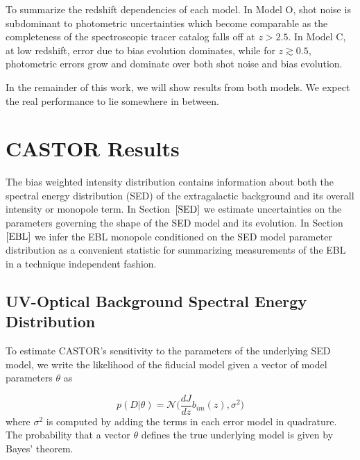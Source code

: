 \documentclass[fleqn,usenatbib]{mnras}
\begin{document}
To summarize the redshift dependencies of each model. In Model O, shot noise is subdominant to photometric uncertainties which become comparable as the completeness of the spectroscopic tracer catalog falls off at $z > 2.5$. In Model C, at low redshift, error due to bias evolution dominates, while for  $z \gtrsim 0.5$, photometric errors grow and dominate over both shot noise and bias evolution.

In the remainder of this work, we will show results from both models. We expect the real performance to lie somewhere in between. 


\section{CASTOR Results} 
\label{sec:results}

The bias weighted intensity distribution contains information about both the spectral energy distribution (SED) of the extragalactic background and its overall intensity or monopole term. In Section~$\ref{SED}$ we estimate uncertainties on the parameters governing the shape of the SED model and its evolution. In Section~$\ref{EBL}$ we infer the EBL monopole conditioned on the SED model parameter distribution as a convenient statistic for summarizing measurements of the EBL in a technique independent fashion.

\subsection{UV-Optical Background Spectral Energy Distribution} 
\label{SED}
 

To estimate {\small CASTOR}'s sensitivity to the parameters of the underlying SED model, we write the likelihood of the fiducial model given a vector of model parameters $\theta$ as 

\begin{equation}
\label{likelihood}
p(D|\theta) = \mathcal{N}\bigg(\frac{dJ}{dz}b_{im}(z), \sigma^2\bigg)
\end{equation}
where $\sigma^2$ is computed by adding the terms in each error model in quadrature. The probability that a vector $\theta$ defines the true underlying model is given by Bayes' theorem.
\end{document}

